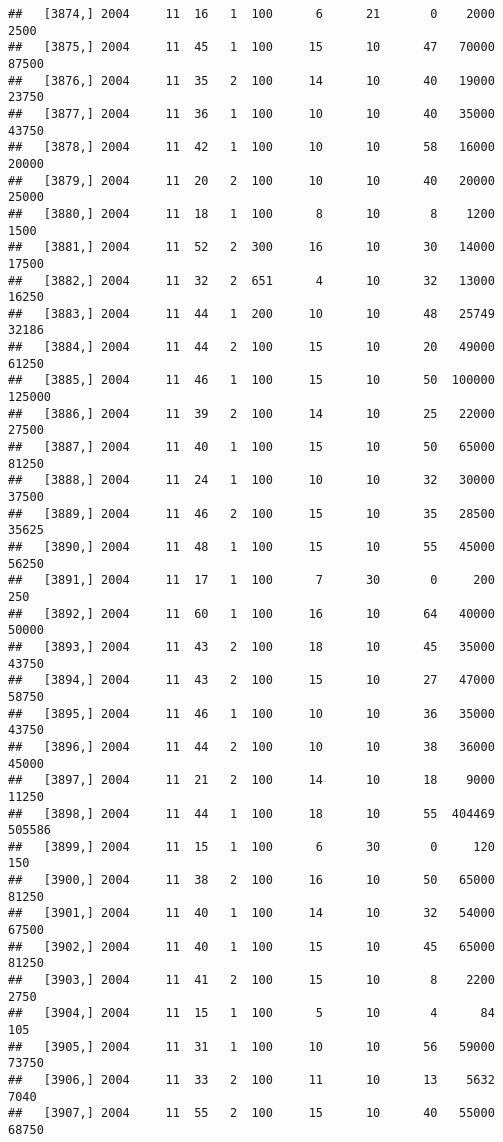 \documentclass{article}\usepackage[]{graphicx}\usepackage[]{color}
\makeatletter
\newenvironment{kframe}{%
 \def\at@end@of@kframe{}%
 \ifinner\ifhmode%
  \def\at@end@of@kframe{\end{minipage}}%
  \begin{minipage}{\columnwidth}%
 \fi\fi%
 \def\FrameCommand##1{\hskip\@totalleftmargin \hskip-\fboxsep
 \colorbox{shadecolor}{##1}\hskip-\fboxsep
     \hskip-\linewidth \hskip-\@totalleftmargin \hskip\columnwidth}%
 \MakeFramed {\advance\hsize-\width
   \@totalleftmargin\z@ \linewidth\hsize
   \@setminipage}}%
 {\par\unskip\endMakeFramed%
 \at@end@of@kframe}
\newenvironment{knitrout}{}{} %
\makeatother
\begin{document}
\begin{knitrout}
\begin{kframe}
\begin{verbatim}
##   [3874,] 2004     11  16   1  100      6      21       0    2000    2500
##   [3875,] 2004     11  45   1  100     15      10      47   70000   87500
##   [3876,] 2004     11  35   2  100     14      10      40   19000   23750
##   [3877,] 2004     11  36   1  100     10      10      40   35000   43750
##   [3878,] 2004     11  42   1  100     10      10      58   16000   20000
##   [3879,] 2004     11  20   2  100     10      10      40   20000   25000
##   [3880,] 2004     11  18   1  100      8      10       8    1200    1500
##   [3881,] 2004     11  52   2  300     16      10      30   14000   17500
##   [3882,] 2004     11  32   2  651      4      10      32   13000   16250
##   [3883,] 2004     11  44   1  200     10      10      48   25749   32186
##   [3884,] 2004     11  44   2  100     15      10      20   49000   61250
##   [3885,] 2004     11  46   1  100     15      10      50  100000  125000
##   [3886,] 2004     11  39   2  100     14      10      25   22000   27500
##   [3887,] 2004     11  40   1  100     15      10      50   65000   81250
##   [3888,] 2004     11  24   1  100     10      10      32   30000   37500
##   [3889,] 2004     11  46   2  100     15      10      35   28500   35625
##   [3890,] 2004     11  48   1  100     15      10      55   45000   56250
##   [3891,] 2004     11  17   1  100      7      30       0     200     250
##   [3892,] 2004     11  60   1  100     16      10      64   40000   50000
##   [3893,] 2004     11  43   2  100     18      10      45   35000   43750
##   [3894,] 2004     11  43   2  100     15      10      27   47000   58750
##   [3895,] 2004     11  46   1  100     10      10      36   35000   43750
##   [3896,] 2004     11  44   2  100     10      10      38   36000   45000
##   [3897,] 2004     11  21   2  100     14      10      18    9000   11250
##   [3898,] 2004     11  44   1  100     18      10      55  404469  505586
##   [3899,] 2004     11  15   1  100      6      30       0     120     150
##   [3900,] 2004     11  38   2  100     16      10      50   65000   81250
##   [3901,] 2004     11  40   1  100     14      10      32   54000   67500
##   [3902,] 2004     11  40   1  100     15      10      45   65000   81250
##   [3903,] 2004     11  41   2  100     15      10       8    2200    2750
##   [3904,] 2004     11  15   1  100      5      10       4      84     105
##   [3905,] 2004     11  31   1  100     10      10      56   59000   73750
##   [3906,] 2004     11  33   2  100     11      10      13    5632    7040
##   [3907,] 2004     11  55   2  100     15      10      40   55000   68750

\end{verbatim}
\end{kframe}
\end{knitrout}
\end{document}
